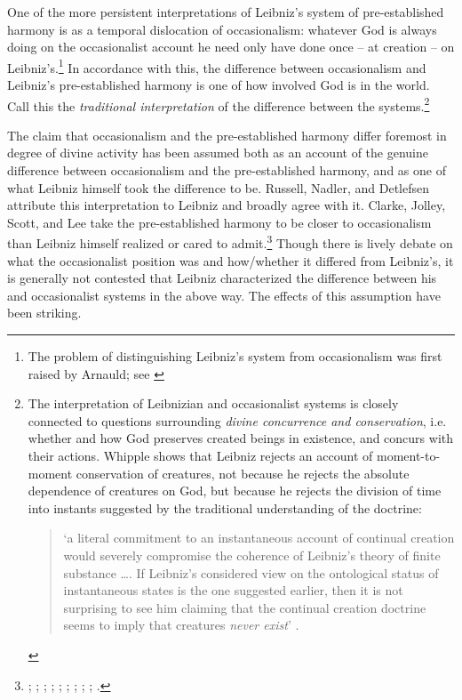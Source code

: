 \documentclass{article}
\begin{document}
One of the more persistent interpretations of Leibniz's system of
pre-established harmony is as a temporal dislocation of occasionalism:
whatever God is always doing on the occasionalist account he need only
have done once -- at creation -- on Leibniz's.\footnote{The problem of
  distinguishing Leibniz's system from occasionalism was first raised by
  Arnauld; see \autocite[vol. II, 84-90]{GP}} In accordance with this, the difference
between occasionalism and Leibniz's pre-established harmony is one of
how involved God is in the world. Call this the \emph{traditional
interpretation} of the difference between the systems.\footnote{The
  interpretation of Leibnizian and occasionalist systems is closely
  connected to questions surrounding \emph{divine concurrence and
  conservation}, i.e. whether and how God preserves created beings in
  existence, and concurs with their actions. Whipple shows that Leibniz rejects
  an account of moment-to-moment conservation of creatures, not because
  he rejects the absolute dependence of creatures on God, but because he
  rejects the division of time into instants suggested by the
  traditional understanding of the doctrine: 
  \begin{quote}
  	`a literal commitment to an
  	instantaneous account of continual creation would severely compromise
  	the coherence of Leibniz's theory of finite substance \ldots. If
  	Leibniz's considered view on the ontological status of instantaneous
  	states is the one suggested earlier, then it is not surprising to see
  	him claiming that the continual creation doctrine seems to imply that
  	creatures \emph{never exist}' \autocite[870]{Whipple2010}.
  \end{quote}}

The claim that occasionalism and the pre-established harmony differ
foremost in degree of divine activity has been assumed both as an
account of the genuine difference between occasionalism and the
pre-established harmony, and as one of what Leibniz himself took the
difference to be. Russell, Nadler, and Detlefsen attribute this
interpretation to Leibniz and broadly agree with it. Clarke, Jolley,
Scott, and Lee take the pre-established harmony to be closer to
occasionalism than Leibniz himself realized or cared to admit.\footnote{\autocite{Russell1951}; \autocite[31-32]{Nadler1993}; \autocite[449]{Detlefsen2003}; \autocite[121]{Clarke1989};
  \autocite{Clarke1995}; \autocite{Scott1997}; \autocite[246]{Jolley2002}; \autocite[106-107]{Jolley1990}; \autocite[39]{Black1997}; \autocite[230]{Lee2004}.} Though there is lively debate on what the
occasionalist position was and how/whether it differed from Leibniz's,
it is generally not contested that Leibniz characterized the difference
between his and occasionalist systems in the above way. The effects of
this assumption have been striking.
\end{document}

